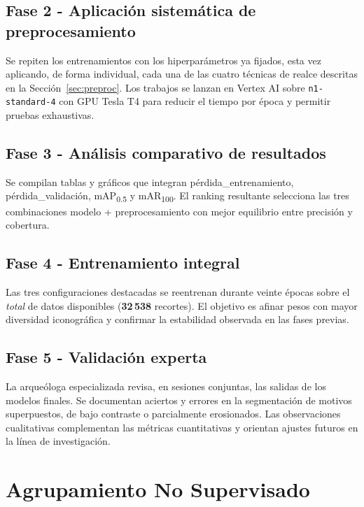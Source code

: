 \subsection*{Fase 2 - Aplicación sistemática de preprocesamiento}

Se repiten los entrenamientos con los hiperparámetros ya fijados, esta vez aplicando, de forma individual, cada una de las cuatro técnicas de realce descritas en la Sección~\ref{sec:preproc}.
Los trabajos se lanzan en Vertex AI sobre \texttt{n1-standard-4} con GPU Tesla T4 para reducir el tiempo por época y permitir pruebas exhaustivas.

\subsection*{Fase 3 - Análisis comparativo de resultados}

Se compilan tablas y gráficos que integran pérdida\_entrenamiento, pérdida\_validación, mAP\textsubscript{0.5} y mAR\textsubscript{100}.
El ranking resultante selecciona las tres combinaciones modelo + preprocesamiento con mejor equilibrio entre precisión y cobertura.

\subsection*{Fase 4 - Entrenamiento integral}

Las tres configuraciones destacadas se reentrenan durante veinte épocas sobre el \emph{total} de datos disponibles (\textbf{32\,538} recortes).
El objetivo es afinar pesos con mayor diversidad iconográfica y confirmar la estabilidad observada en las fases previas.

\subsection*{Fase 5 - Validación experta}

La arqueóloga especializada revisa, en sesiones conjuntas, las salidas de los modelos finales.
Se documentan aciertos y errores en la segmentación de motivos superpuestos, de bajo contraste o parcialmente erosionados.
Las observaciones cualitativas complementan las métricas cuantitativas y orientan ajustes futuros en la línea de investigación.

\section{Agrupamiento No Supervisado}
\label{sec:unsup}

